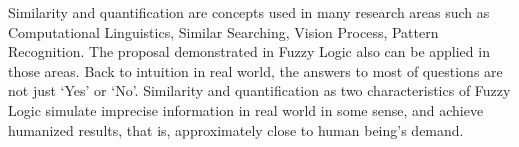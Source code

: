\documentclass[Thesis.tex]{subfiles}
\begin{document}
Similarity and quantification are concepts used in many research areas such as Computational Linguistics, Similar Searching, Vision Process, Pattern Recognition. The proposal demonstrated in Fuzzy Logic also can be applied in those areas. Back to intuition in real world, the answers to most of questions are not just `Yes' or `No'. Similarity and quantification as two characteristics of Fuzzy Logic simulate imprecise information in real world in some sense, and achieve humanized results, that is, approximately close to human being's demand. 
\end{document}
